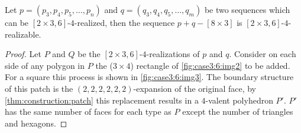 \begin{lemma}\label{thm:case3:6:compose}
  Let $p = (p_3, p_4, p_5, \dots, p_n)$ and $q = (q_3, q_4, q_5, \dots, q_m)$ be two sequences which can be $[2 \times 3, 6]$-$4$-realized, then the sequence $p + q - [8 \times 3]$ is $[2\times3, 6]$-$4$-realizable.
  \begin{proof}
    Let $P$ and $Q$ be the $[2 \times 3, 6]$-$4$-realizations of $p$ and $q$. Consider on each side of any polygon in $P$ the ($3 \times 4$) rectangle of \autoref{fig:case3:6:img2} to be added. For a square this process is shown in \autoref{fig:case3:6:img3}. The boundary structure of this patch is the $(2, 2, 2, 2, 2, 2)$-expansion of the original face, by \autoref{thm:construction:patch} this replacement results in a $4$-valent polyhedron $P'$. $P'$ has the same number of faces for each type as $P$ except the number of triangles and hexagons.


\end{proof}
\end{lemma}
